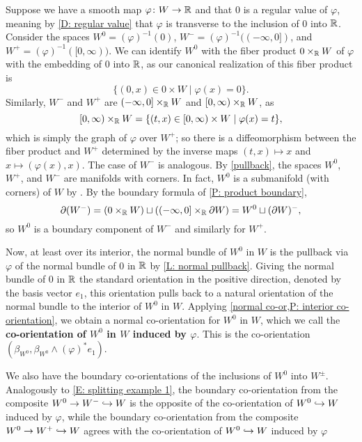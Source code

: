 \begin{example}\label{E: manifold decomposition}
	Suppose we have a smooth map $\varphi \colon W \to \mathbb{R}$ and that $0$ is a regular value of $\varphi$, meaning by \cref{D: regular value} that $\varphi$ is transverse to the inclusion of $0$ into $\mathbb{R}$.
	Consider the spaces $W^0 = (\varphi)^{-1}(0)$, $W^- = (\varphi)^{-1}((-\infty,0])$, and $W^+ = (\varphi)^{-1}([0,\infty))$.
	We can identify $W^0$ with the fiber product $0 \times_{\mathbb{R}} W$ of $\varphi$ with the embedding of $0$ into $\mathbb{R}$, as our canonical realization of this fiber product is
	$$\{(0,x) \in 0 \times W \mid \varphi (x)= 0\}.$$
	Similarly, $W^-$ and $W^+$ are $(-\infty,0] \times_{\mathbb{R}} W$ and $[0,\infty) \times_{\mathbb{R}} W$,
	as $$[0,\infty) \times_{\mathbb{R}} W = \{(t,x) \in [0,\infty) \times W \mid \varphi(x) = t\},$$
	which is simply the graph of $\varphi$ over $W^+$;
	so there is a diffeomorphism between the fiber product and $W^+$ determined by the inverse maps $(t,x) \mapsto x$ and $x \mapsto (\varphi(x), x)$.
	The case of $W^-$ is analogous.
	By \cref{pullback}, the spaces $W^0$, $W^+$, and $W^-$ are manifolds with corners.
	In fact, $W^0$ is a submanifold (with corners) of $W$ by \cite[Proposition 4.2.9]{MaDo92}.
	By the boundary formula of \cref{P: product boundary},
	$$\partial (W^-)= \left(0 \times_{\mathbb{R}} W\right) \sqcup \left((-\infty,0] \times_{\mathbb{R}} \partial W\right) = W^0 \sqcup (\partial W)^-,$$
	so $W^0$ is a boundary component of $W^-$ and similarly for $W^+$.

	Now, at least over its interior, the normal bundle of $W^0$ in $W$ is the pullback via $\varphi$ of the normal bundle of $0$ in $\mathbb{R}$ by \cref{L: normal pullback}. Giving the normal bundle of $0$ in $\mathbb{R}$ the standard orientation in the positive direction, denoted by the basis vector $e_1$, this orientation pulls back to a natural orientation of the normal bundle to the interior of $W^0$ in $W$. Applying \cref{normal co-or,P: interior co-orientation}, we obtain a normal co-orientation for $W^0$ in $W$, which we call the \textbf{co-orientation of $W^0$ in $W$ induced by $\varphi$}. This is the co-orientation $(\beta_{W^0}, \beta_{W^0} \wedge (\varphi)^*e_1)$.

	We also have the boundary co-orientations of the inclusions of $W^0$ into $W^{\pm}$.
	Analogously to \cref{E: splitting example 1}, the boundary co-orientation from the composite $W^0 \to W^- \hookrightarrow W$ is the opposite of the co-orientation of $W^0\hookrightarrow W$ induced by $\varphi$, while the boundary co-orientation from the composite $W^0 \to W^+ \hookrightarrow W$ agrees with the co-orientation of $W^0\hookrightarrow W$ induced by $\varphi$


\end{example}

